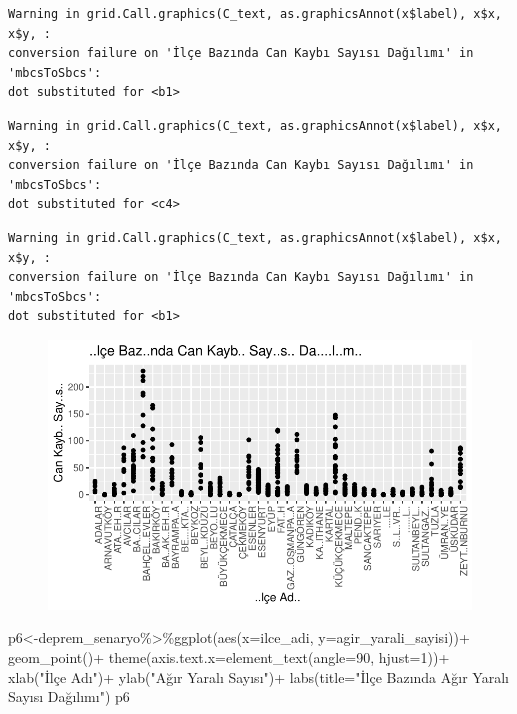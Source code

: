 \documentclass[
  11pt,
  a4paper,
  DIV=11,
  numbers=noendperiod]{scrartcl}
\newenvironment{Shaded}{\begin{snugshade}}{\end{snugshade}}
\newcommand{\AttributeTok}[1]{\textcolor[rgb]{0.40,0.45,0.13}{#1}}
\newcommand{\DecValTok}[1]{\textcolor[rgb]{0.68,0.00,0.00}{#1}}
\newcommand{\FunctionTok}[1]{\textcolor[rgb]{0.28,0.35,0.67}{#1}}
\newcommand{\NormalTok}[1]{\textcolor[rgb]{0.00,0.23,0.31}{#1}}
\newcommand{\OtherTok}[1]{\textcolor[rgb]{0.00,0.23,0.31}{#1}}
\newcommand{\SpecialCharTok}[1]{\textcolor[rgb]{0.37,0.37,0.37}{#1}}
\newcommand{\StringTok}[1]{\textcolor[rgb]{0.13,0.47,0.30}{#1}}
\begin{document}
\begin{verbatim}
Warning in grid.Call.graphics(C_text, as.graphicsAnnot(x$label), x$x, x$y, :
conversion failure on 'İlçe Bazında Can Kaybı Sayısı Dağılımı' in 'mbcsToSbcs':
dot substituted for <b1>
\end{verbatim}

\begin{verbatim}
Warning in grid.Call.graphics(C_text, as.graphicsAnnot(x$label), x$x, x$y, :
conversion failure on 'İlçe Bazında Can Kaybı Sayısı Dağılımı' in 'mbcsToSbcs':
dot substituted for <c4>
\end{verbatim}

\begin{verbatim}
Warning in grid.Call.graphics(C_text, as.graphicsAnnot(x$label), x$x, x$y, :
conversion failure on 'İlçe Bazında Can Kaybı Sayısı Dağılımı' in 'mbcsToSbcs':
dot substituted for <b1>
\end{verbatim}

\begin{figure}[H]

{\centering \includegraphics{project_files/figure-pdf/unnamed-chunk-4-1.pdf}

}

\end{figure}

\begin{Shaded}
\begin{Highlighting}[]
\NormalTok{p6}\OtherTok{\textless{}{-}}\NormalTok{deprem\_senaryo}\SpecialCharTok{\%\textgreater{}\%}\FunctionTok{ggplot}\NormalTok{(}\FunctionTok{aes}\NormalTok{(}\AttributeTok{x=}\NormalTok{ilce\_adi, }\AttributeTok{y=}\NormalTok{agir\_yarali\_sayisi))}\SpecialCharTok{+}
  \FunctionTok{geom\_point}\NormalTok{()}\SpecialCharTok{+}
  \FunctionTok{theme}\NormalTok{(}\AttributeTok{axis.text.x=}\FunctionTok{element\_text}\NormalTok{(}\AttributeTok{angle=}\DecValTok{90}\NormalTok{, }\AttributeTok{hjust=}\DecValTok{1}\NormalTok{))}\SpecialCharTok{+}
  \FunctionTok{xlab}\NormalTok{(}\StringTok{"İlçe Adı"}\NormalTok{)}\SpecialCharTok{+}
  \FunctionTok{ylab}\NormalTok{(}\StringTok{"Ağır Yaralı Sayısı"}\NormalTok{)}\SpecialCharTok{+}
  \FunctionTok{labs}\NormalTok{(}\AttributeTok{title=}\StringTok{"İlçe Bazında Ağır Yaralı Sayısı Dağılımı"}\NormalTok{)}
\NormalTok{p6}
\end{Highlighting}
\end{Shaded}
\end{document}
